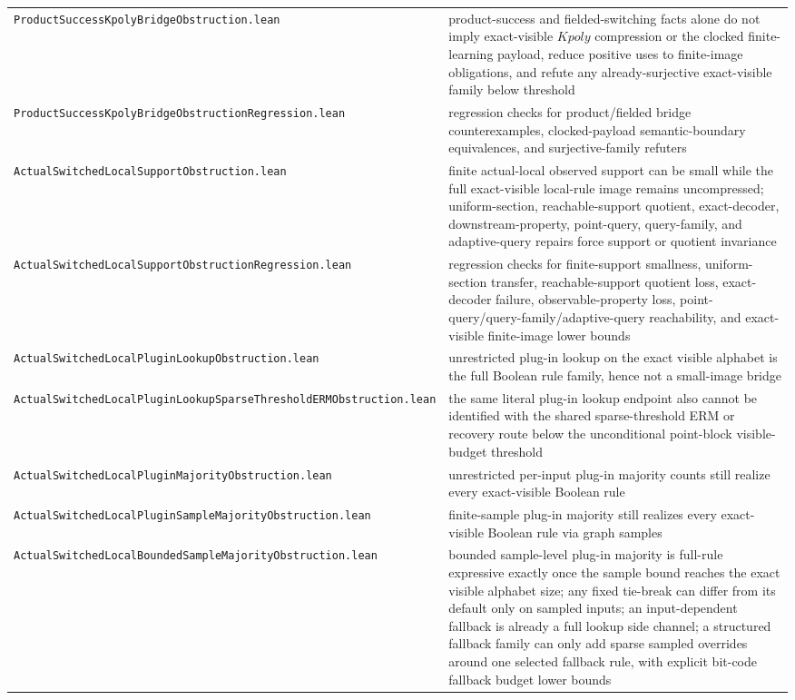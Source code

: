 \documentclass[11pt]{article}
\theoremstyle{remark}
\begin{document}
\begin{center}
\begin{tabular}{ll}
\texttt{ProductSuccessKpolyBridgeObstruction.lean} & product-success and fielded-switching facts alone do not imply exact-visible \(Kpoly\) compression or the clocked finite-learning payload, reduce positive uses to finite-image obligations, and refute any already-surjective exact-visible family below threshold \\
\texttt{ProductSuccessKpolyBridgeObstructionRegression.lean} & regression checks for product/fielded bridge counterexamples, clocked-payload semantic-boundary equivalences, and surjective-family refuters \\
\texttt{ActualSwitchedLocalSupportObstruction.lean} & finite actual-local observed support can be small while the full exact-visible local-rule image remains uncompressed; uniform-section, reachable-support quotient, exact-decoder, downstream-property, point-query, query-family, and adaptive-query repairs force support or quotient invariance \\
\texttt{ActualSwitchedLocalSupportObstructionRegression.lean} & regression checks for finite-support smallness, uniform-section transfer, reachable-support quotient loss, exact-decoder failure, observable-property loss, point-query/query-family/adaptive-query reachability, and exact-visible finite-image lower bounds \\
\texttt{ActualSwitchedLocalPluginLookupObstruction.lean} & unrestricted plug-in lookup on the exact visible alphabet is the full Boolean rule family, hence not a small-image bridge \\
\texttt{ActualSwitchedLocalPluginLookupSparseThresholdERMObstruction.lean} & the same literal plug-in lookup endpoint also cannot be identified with the shared sparse-threshold ERM or recovery route below the unconditional point-block visible-budget threshold \\
\texttt{ActualSwitchedLocalPluginMajorityObstruction.lean} & unrestricted per-input plug-in majority counts still realize every exact-visible Boolean rule \\
\texttt{ActualSwitchedLocalPluginSampleMajorityObstruction.lean} & finite-sample plug-in majority still realizes every exact-visible Boolean rule via graph samples \\
\texttt{ActualSwitchedLocalBoundedSampleMajorityObstruction.lean} & bounded sample-level plug-in majority is full-rule expressive exactly once the sample bound reaches the exact visible alphabet size; any fixed tie-break can differ from its default only on sampled inputs; an input-dependent fallback is already a full lookup side channel; a structured fallback family can only add sparse sampled overrides around one selected fallback rule, with explicit bit-code fallback budget lower bounds \\

\end{tabular}
\end{center}
\end{document}
